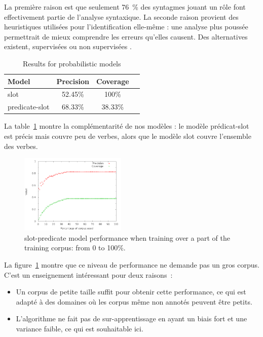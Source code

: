 La première raison est que seulement 76~\% des syntagmes jouant un rôle font
effectivement partie de l'analyse syntaxique.
La seconde raison provient des heuristiques utilisées pour l'identification
elle-même : une analyse plus poussée permettrait de mieux comprendre les
erreurs qu'elles causent. Des alternatives existent, supervisées ou non
supervisées \citep{abend2009unsupervised}.

\begin{table}[ht]
    \centering
    \begin{tabular}{lccc}
        \toprule
        Model          & Precision & Coverage \\
        \midrule
        slot           & 52.45\% & 100\% \\
        predicate-slot & 68.33\% & 38.33\% \\
        \bottomrule
    \end{tabular}
    \caption{\protect\centering\label{table:probabilisticresults}Results for probabilistic models}
\end{table}

La table~\ref{table:probabilisticresults} montre la complémentarité de nos
modèles : le modèle prédicat-slot est précis mais couvre peu de verbes, alors
que le modèle slot couvre l'ensemble des verbes.

\begin{figure}[t]
    \centering
    \includegraphics[width=0.45\textwidth]{fig/slot-predicate-percents.png}
    \caption{\label{fig:slot_predicate} slot-predicate model performance when training over a part of the training corpus: from 0 to 100\%.}
\end{figure}

La figure~\ref{fig:slot_predicate} montre que ce niveau de performance ne
demande pas un gros corpus. C'est un enseignement intéressant pour deux
raisons~:

\begin{itemize}

    \item Un corpus de petite taille suffit pour obtenir cette performance, ce
    qui est adapté à des domaines où les corpus même non annotés peuvent être
    petits.

    \item L'algorithme ne fait pas de sur-apprentissage en ayant un biais fort
    et une variance faible, ce qui est souhaitable ici.

\end{itemize}

